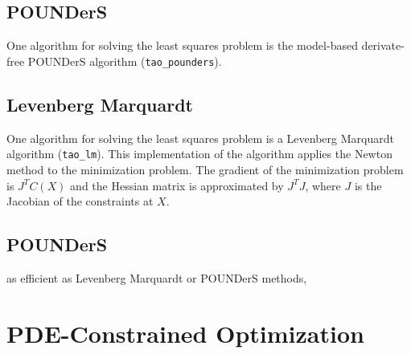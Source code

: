 \subsection{POUNDerS}
   One algorithm for solving the least squares problem is the model-based
derivate-free POUNDerS algorithm (\texttt{tao\_pounders}).


\subsection{Levenberg Marquardt}
   One algorithm for solving the least squares problem is a Levenberg
Marquardt algorithm (\texttt{tao\_lm}).  This implementation of the 
algorithm applies the Newton  method to the minimization problem.
The gradient of the minimization
problem is $J^T C(X)$ and the Hessian matrix is approximated by
$J^T J$, where $J$ is the Jacobian of the constraints at $X$.

\subsection{POUNDerS}

as efficient as Levenberg Marquardt or POUNDerS methods,
\section{PDE-Constrained Optimization}
\label{sec:pdeconstrained}

